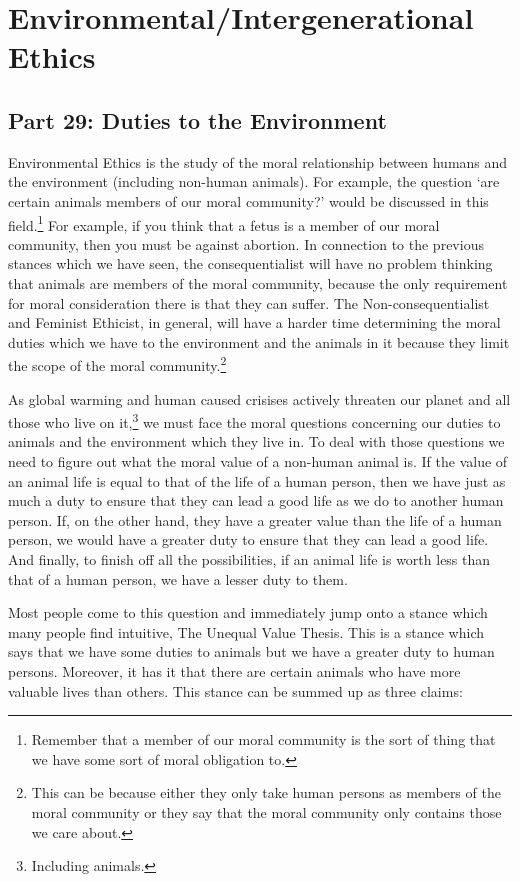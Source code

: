 \part{Environmental/Intergenerational Ethics}
\label{ch.mod10}
\chapter{Part 29: Duties to the Environment}

Environmental Ethics is the study of the moral relationship between humans and the environment (including non-human animals). For example, the question ‘are certain animals members of our moral community?’ would be discussed in this field.\footnote{ Remember that a member of our moral community is the sort of thing that we have some sort of moral obligation to.} For example, if you think that a fetus is a member of our moral community, then you must be against abortion. In connection to the previous stances which we have seen, the consequentialist will have no problem thinking that animals are members of the moral community, because the only requirement for moral consideration there is that they can suffer. The Non-consequentialist and Feminist Ethicist, in general, will have a harder time determining the moral duties which we have to the environment and the animals in it because they limit the scope of the moral community.\footnote{This can be because either they only take human persons as members of the moral community or they say that the moral community only contains those we care about.}

As global warming and human caused crisises actively threaten our planet and all those who live on it,\footnote{Including animals.} we must face the moral questions concerning our duties to animals and the environment which they live in. To deal with those questions we need to figure out what the moral value of a non-human animal is. If the value of an animal life is equal to that of the life of a human person, then we have just as much a duty to ensure that they can lead a good life as we do to another human person. If, on the other hand, they have a greater value than the life of a human person, we would have a greater duty to ensure that they can lead a good life. And finally, to finish off all the possibilities, if an animal life is worth less than that of a human person, we have a lesser duty to them. 

Most people come to this question and immediately jump onto a stance which many people find intuitive, The Unequal Value Thesis. This is a stance which says that we have some duties to animals but we have a greater duty to human persons. Moreover, it has it that there are certain animals who have more valuable lives than others. This stance can be summed up as three claims: 

